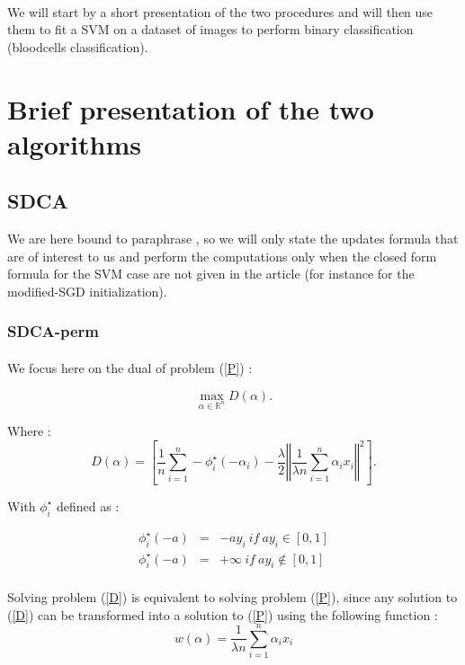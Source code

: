 \documentclass[10pt,a4paper]{article}
\begin{document}
\paragraph{}
We will start by a short presentation of the two procedures and will then use them to fit a SVM on a dataset of images to perform binary classification (bloodcells classification).


\section{Brief presentation of the two algorithms}

\subsection{SDCA}

We are here bound to paraphrase \cite{1}, so we will only state the updates formula that are of interest to us and perform the computations only when the closed form formula for the SVM case are not given in the article (for instance for the modified-SGD initialization).

\subsubsection{SDCA-perm}

\paragraph{}
We focus here on the dual of problem (\ref{P}) : 

\begin{equation}\label{D}
\max_{\alpha \in \mathbb{R}^n} D(\alpha).
\end{equation}

Where : 
$$D(\alpha) = \left [ \frac{1}{n} \sum_{i=1}^n - \phi_i^{\star} (-\alpha_i) - \frac{\lambda}{2} \left \Vert \frac{1}{\lambda n} \sum_{i=1}^n \alpha_i x_i\right \Vert ^2 \right ].$$

With $ \phi_i^{\star}$ defined as : 

\begin{eqnarray*}
\phi_i^{\star} (-a) &=& -ay_i ~if~ ay_i \in [0, 1]\\
\phi_i^{\star} (-a) &=& + \infty ~if~ ay_i \notin [0, 1]
\end{eqnarray*}

\paragraph{}
Solving problem (\ref{D}) is equivalent to solving problem (\ref{P}), since any solution to (\ref{D}) can be transformed into a solution to (\ref{P}) using the following function \cite{1} : 
$$ w(\alpha) = \frac{1}{\lambda n} \sum_{i=1}^n \alpha_i x_i$$
\end{document}
